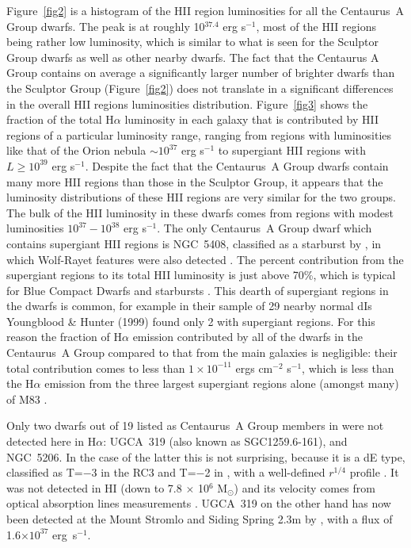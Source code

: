 \documentclass[preprint]{aastex}
\begin{document}
Figure~\ref{fig2} is a histogram of the HII region luminosities for all
the Centaurus~A Group dwarfs. The peak is at roughly 10$^{37.4}$ erg s$^{-1}$, 
most of the HII regions being rather low luminosity, which is similar to what
is seen for the Sculptor Group dwarfs as well as other nearby dwarfs.
The fact that the Centaurus A Group contains on average a significantly larger number of brighter dwarfs
than the Sculptor Group (Figure~\ref{fig2}) does not translate in a significant
differences in the overall HII regions luminosities distribution.
Figure~\ref{fig3} shows the fraction of the total H$\alpha$ luminosity in 
each galaxy that is contributed by HII regions of a particular luminosity range,
ranging from regions with luminosities like that of the Orion nebula
$\sim 10^{37}$ erg s$^{-1}$ to supergiant HII regions with $L\geq 10^{39}$
erg s$^{-1}$. Despite the fact that the Centaurus~A Group dwarfs contain many
more HII regions than those in the Sculptor Group, it appears that the luminosity 
distributions of these HII regions are very similar for the two groups.
The bulk of the HII luminosity in these dwarfs comes from regions with
modest luminosities $10^{37}-10^{38}$ erg s$^{-1}$. The only Centaurus~A Group
dwarf
which contains supergiant HII regions is NGC~5408, classified as a starburst
by \citet{khdl01}, in which Wolf-Rayet features were also detected
\citep{scp99}. The percent contribution from the supergiant regions
to its total HII luminosity is just above 70\%, which is typical for
Blue Compact Dwarfs and starbursts \citep{yh99}.
This dearth of supergiant regions in the dwarfs is common, for example in their
sample of 29 nearby normal dIs Youngblood \& Hunter (1999) found only 2 with supergiant regions.
For this reason the fraction of
H$\alpha$ emission contributed by all of the dwarfs in the Centaurus~A Group
compared to that from the main galaxies is negligible: their total
contribution comes to less than $1\times 10^{-11}$ ergs cm$^{-2}$ s$^{-1}$,
which is less than the H$\alpha$ emission from the three largest supergiant
regions alone (amongst many) of M83 \citep{rk83}.  

Only two dwarfs out of 19 listed as 
Centaurus~A Group members in \citet{cfcq97} were not detected here 
in H$\alpha$: UGCA~319 (also known as SGC1259.6-161), and NGC~5206. 
In the case of the latter this is not surprising, because it is a dE type,
classified as T=$-$3 in the RC3 and T=$-$2 in \citet{lv89},
with a well-defined $r^{1/4}$ profile \citep{pbka93}.
It was not detected in HI (down to 7.8 $\times$ 10$^6$ M$_{\odot}$) 
and its velocity comes from optical absorption lines
measurements \citep{cfcq97}. UGCA~319 on the other hand has 
now been detected at the Mount Stromlo and Siding Spring 2.3m
by \citet{bou09}, with a flux of 1.6$\times 10^{37}$ erg\  s$^{-1}$.
 
\end{document}
